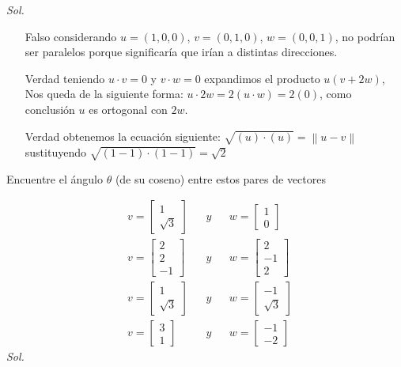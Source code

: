 \textit{ Sol. }

\begin{enumerate}
	\item [Falso] considerando $u=(1,0,0)$, $v=(0,1,0)$, $w=(0,0,1)$, no podrían ser paralelos porque significaría que irían a distintas direcciones.
	\item [Verdad] teniendo $u \cdot v = 0$ y $v \cdot w =0$ expandimos el producto $u\left(v+2w\right)$, Nos queda de la siguiente forma: $u\cdot 2w =2(u\cdot w) =2(0)$, como conclusión $u$ es ortogonal con $2w$.
	\item [Verdad] obtenemos la ecuación siguiente: $\sqrt{\left(u\right) \cdot \left(u\right)} =\left\lVert u-v\right\rVert$ sustituyendo $\sqrt{\left(1-1\right) \cdot \left(1-1\right)} = \sqrt{2}$
\end{enumerate}

\begin{problem}
Encuentre el ángulo $\theta$ (de su coseno) entre estos pares de vectores
\end{problem}

\begin{align}
	 & v=\begin{bmatrix} 1\\ \sqrt{3} \end{bmatrix} &  & y &  & w=\begin{bmatrix} 1\\ 0 \end{bmatrix}         \\
	 & v=\begin{bmatrix} 2\\ 2\\ -1 \end{bmatrix}   &  & y &  & w=\begin{bmatrix} 2\\ -1\\ 2 \end{bmatrix}    \\
	 & v=\begin{bmatrix} 1\\ \sqrt{3} \end{bmatrix} &  & y &  & w=\begin{bmatrix} -1\\ \sqrt{3} \end{bmatrix} \\
	 & v=\begin{bmatrix} 3\\ 1 \end{bmatrix}        &  & y &  & w=\begin{bmatrix} -1\\ -2 \end{bmatrix}
\end{align}
\textit{ Sol. }

